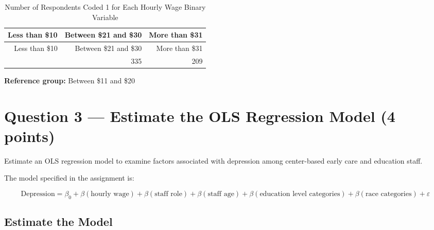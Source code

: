 \documentclass[
]{article}
\begin{document}
\begin{longtable}[]{@{}rrr@{}}
\caption{Number of Respondents Coded 1 for Each Hourly Wage Binary
Variable}\tabularnewline
\toprule\noalign{}
Less than \$10 & Between \$21 and \$30 & More than \$31 \\
\midrule\noalign{}
\endfirsthead
\toprule\noalign{}
Less than \$10 & Between \$21 and \$30 & More than \$31 \\
\midrule\noalign{}
\endhead
\bottomrule\noalign{}
\endlastfoot
1088 & 335 & 209 \\
\end{longtable}

\textbf{Reference group:} Between \$11 and \$20

\newpage

\section{Question 3 --- Estimate the OLS Regression Model (4
points)}\label{question-3-estimate-the-ols-regression-model-4-points}

Estimate an OLS regression model to examine factors associated with
depression among center-based early care and education staff.

The model specified in the assignment is:

\[
\text{Depression} =
\beta_0 +
\beta(\text{hourly wage}) +
\beta(\text{staff role}) +
\beta(\text{staff age}) +
\beta(\text{education level categories}) +
\beta(\text{race categories}) +
\varepsilon
\]

\newpage

\subsection{Estimate the Model}\label{estimate-the-model}
\end{document}
